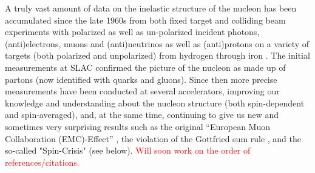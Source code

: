 A truly vast amount of data on the inelastic structure of the nucleon%
has been accumulated since the late 1960s %
from both fixed target and colliding beam experiments with polarized as well as un-polarized incident photons, (anti)electrons, muons and (anti)neutrinos as well as (anti)protons on a variety of targets (both polarized and unpolarized) from hydrogen through iron \cite{KuhnHUGS}. %
 The initial measurements at SLAC confirmed the picture of the nucleon as made up of partons (now identified with quarks and gluons). Since then more precise measurements have been conducted at several accelerators, improving our knowledge and understanding about the nucleon structure (both spin-dependent and spin-averaged), and, at the same time, continuing to give us new and sometimes very surprising results such as the original ``European Muon Collaboration (EMC)-Effect'' \cite{Aubert1983275}, %
 the violation of the Gottfried sum rule \cite{PhysRevLett.18.1174, PhysRevD.50.R1}, and the so-called "Spin-Crisis"  \cite{Ashman1988364, Piguet:1989va} (see below). %
\textcolor{red}{Will soon work on the order of references/citations.}

